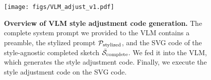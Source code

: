 \begin{figure}[!t]
  \centering
  \texttt{[image: figs/VLM\_adjust\_v1.pdf]}
  \caption{
\textbf{Overview of VLM style adjustment code generation.} 
The complete system prompt we provided to the VLM contains a preamble, the stylized prompt $\mathcal{P}_{\mathrm{stylized}}$, and the SVG code of the style-agnostic completed sketch $\mathcal{\bar{S}}_{\mathrm{complete}}$.
We fed it into the VLM, which generates the style adjustment code.
Finally, we execute the style adjustment code on the SVG code.
}
  \label{fig:vlm_adjust}
\end{figure}
